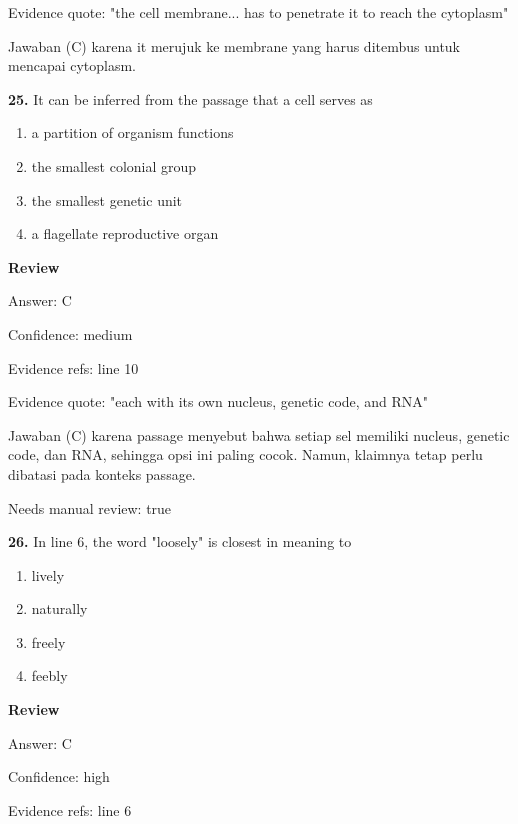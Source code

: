 \documentclass[12pt]{article}
\begin{document}
Evidence quote: "the cell membrane... has to penetrate it to reach the cytoplasm"\par
Jawaban (C) karena it merujuk ke membrane yang harus ditembus untuk mencapai cytoplasm.\par
\endgroup
\par
\vspace{0.25\baselineskip}
\noindent\textbf{25.} It can be inferred from the passage that a cell serves as
\begin{enumerate}[label=(\Alph*),leftmargin=*,itemsep=0.2em]
\item a partition of organism functions
\item the smallest colonial group
\item the smallest genetic unit
\item a flagellate reproductive organ
\end{enumerate}
\par
\begingroup
\setlength{\parskip}{0pt}
\setlength{\parindent}{0pt}
\textbf{Review}\par
Answer: C\par
Confidence: medium\par
Evidence refs: line 10\par
Evidence quote: "each with its own nucleus, genetic code, and RNA"\par
Jawaban (C) karena passage menyebut bahwa setiap sel memiliki nucleus, genetic code, dan RNA, sehingga opsi ini paling cocok. Namun, klaimnya tetap perlu dibatasi pada konteks passage.\par
Needs manual review: true\par
\endgroup
\par
\vspace{0.25\baselineskip}
\noindent\textbf{26.} In line 6, the word "loosely" is closest in meaning to
\begin{enumerate}[label=(\Alph*),leftmargin=*,itemsep=0.2em]
\item lively
\item naturally
\item freely
\item feebly
\end{enumerate}
\par
\begingroup
\setlength{\parskip}{0pt}
\setlength{\parindent}{0pt}
\textbf{Review}\par
Answer: C\par
Confidence: high\par
Evidence refs: line 6\par
\end{document}
